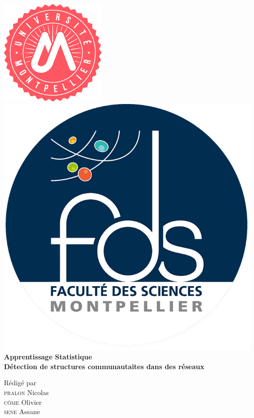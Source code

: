 \documentclass[frenchb]{report}
\newcommand{\1}{\mathbbm{1}}
\theoremstyle{definition}\newtheorem{defn}{Définition}
\theoremstyle{definition}\newtheorem{exm}{Exemple}
\theoremstyle{definition}\newtheorem{nota}{Notation}
\theoremstyle{definition}\newtheorem{rem}{Remarque}
\begin{document}
\def\appendixpage{\vspace*{8cm}
\begin{center}
\Huge\textbf{Annexes}
\end{center}
}
\def\appendixname{Annexe}%

\begin{titlepage}
\begin{center}
\includegraphics[scale=0.6]{logo.png}
\hfill
\includegraphics[scale=0.35]{fds_logo.png}\\[3cm]
\linespread{1.2}\huge {\bfseries Apprentissage Statistique }\\[0.5cm]
\linespread{1.2}\LARGE {\bfseries Détection de structures communautaites dans des réseaux}\\[1.5cm]
\linespread{1}

{\large Rédigé par\\}
{\Large \textsc{pralon} Nicolas}\\
{\Large \textsc{côme} Olivier}\\
{\Large \textsc{sene} Assane}\\[1cm]


\end{center}
\end{titlepage}
\end{document}
